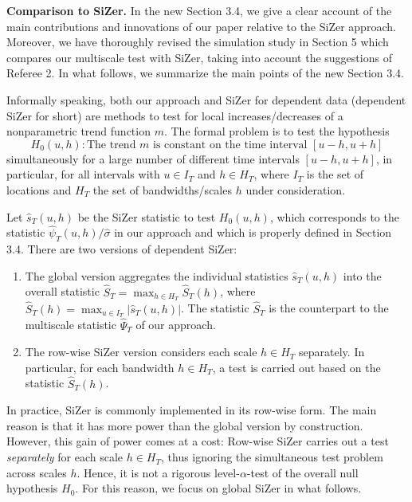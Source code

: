 \documentclass[a4paper,12pt]{article}
\begin{document}
\textbf{Comparison to SiZer.} In the new Section 3.4, we give a clear account of the main contributions and innovations of our paper relative to the SiZer approach.
Moreover, we have thoroughly revised the simulation study in Section 5 which compares our multiscale test with SiZer, taking into account the suggestions of Referee 2. 
In what follows, we summarize the main points of the new Section 3.4. 


Informally speaking, both our approach and SiZer for dependent data (dependent SiZer for short) are methods to test for local increases/decreases of a nonparametric trend function $m$. The formal problem is to test the hypothesis
\[ H_0(u,h): \text{The trend } m \text{ is constant on the time interval } [u-h,u+h] \]
simultaneously for a large number of different time intervals $[u-h,u+h]$, in particular, for all intervals with $u \in I_T$ and $h \in H_T$, where $I_T$ is the set of locations and $H_T$ the set of bandwidths/scales $h$ under consideration. 


Let $\widehat{s}_T(u,h)$ be the SiZer statistic to test $H_0(u,h)$, which corresponds to the statistic $\widehat{\psi}_T(u,h)/\widehat{\sigma}$ in our approach and which is properly defined in Section 3.4. There are two versions of dependent SiZer: 
\begin{enumerate}[label=(\alph*), leftmargin=0.8cm]

\item The global version aggregates the individual statistics $\widehat{s}_T(u,h)$ into the overall statistic $\widehat{S}_T = \max_{h \in H_T} \widehat{S}_T(h)$, where $\widehat{S}_T(h) = \max_{u \in I_T} |\widehat{s}_T(u,h)|$. The statistic $\widehat{S}_T$ is the counterpart to the multiscale statistic $\widehat{\Psi}_T$ of our approach. 

\item The row-wise SiZer version considers each scale $h \in H_T$ separately. In particular, for each bandwidth $h \in H_T$, a test is carried out based on the statistic $\widehat{S}_T(h)$. 

\end{enumerate}
In practice, SiZer is commonly implemented in its row-wise form. The main reason is that it has more power than the global version by construction. However, this gain of power comes at a cost: Row-wise SiZer carries out a test \textit{separately} for each scale $h \in H_T$, thus ignoring the simultaneous test problem across scales $h$. Hence, it is not a rigorous level-$\alpha$-test of the overall null hypothesis $H_0$. For this reason, we focus on global SiZer in what follows. 
\end{document}
